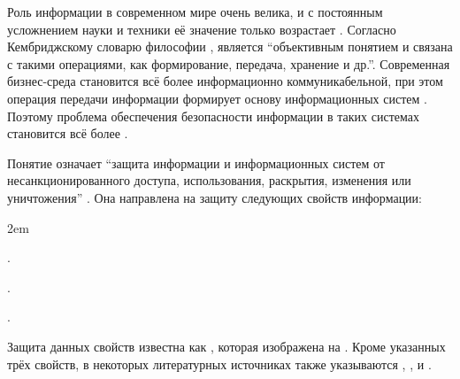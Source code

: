 %
Роль информации в современном мире очень велика, и с постоянным усложнением науки и техники её значение только возрастает .
%
Согласно Кембриджскому словарю философии ,  является ``объективным понятием и связана с такими операциями, как формирование, передача, хранение и др.''.
%
Современная бизнес-среда становится всё более информационно коммуникабельной, при этом операция передачи информации формирует основу информационных систем . 
%
Поэтому проблема обеспечения безопасности информации в таких системах становится всё более .

%
Понятие  означает ``защита информации и информационных систем от несанкционированного доступа, использования, раскрытия, изменения или уничтожения'' . 
%
Она направлена на защиту следующих свойств информации:
\begin{description}
	\leftskip2em%
	\setlength{\itemsep}{0pt}%
	\setlength{\parsep}{0pt}%

	\item[Целостность] .

	\item[Конфиденциальность] .

	\item[Доступность] .
\end{description}

%
Защита данных свойств известна как , которая изображена на . 
%
Кроме указанных трёх свойств, в некоторых литературных источниках также указываются , ,  и  . 



